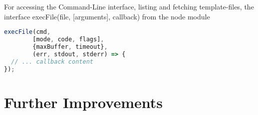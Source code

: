 For accessing the Command-Line interface, listing and fetching template-files, the interface execFile(file, [arguments], callback) from the node module


\begin{lstlisting}[language=javascript]
execFile(cmd,
        [mode, code, flags],
        {maxBuffer, timeout},
        (err, stdout, stderr) => {
  // ... callback content
});
\end{lstlisting}





\section*{Further Improvements}
%
